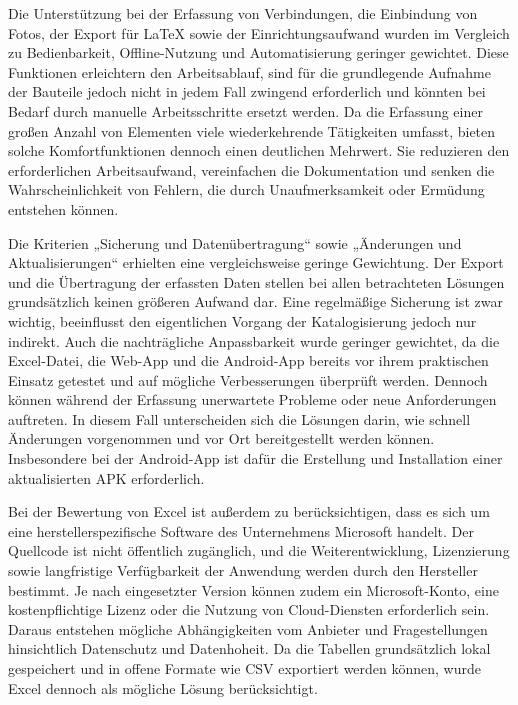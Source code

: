 Die Unterstützung bei der Erfassung von Verbindungen, die Einbindung von Fotos, der Export für \LaTeX{} sowie der Einrichtungsaufwand wurden im Vergleich zu Bedienbarkeit, Offline-Nutzung und Automatisierung geringer gewichtet.
Diese Funktionen erleichtern den Arbeitsablauf, sind für die grundlegende Aufnahme der Bauteile jedoch nicht in jedem Fall zwingend erforderlich und könnten bei Bedarf durch manuelle Arbeitsschritte ersetzt werden.
Da die Erfassung einer großen Anzahl von Elementen viele wiederkehrende Tätigkeiten umfasst, bieten solche Komfortfunktionen dennoch einen deutlichen Mehrwert.
Sie reduzieren den erforderlichen Arbeitsaufwand, vereinfachen die Dokumentation und senken die Wahrscheinlichkeit von Fehlern, die durch Unaufmerksamkeit oder Ermüdung entstehen können.

Die Kriterien „Sicherung und Datenübertragung“ sowie „Änderungen und Aktualisierungen“ erhielten eine vergleichsweise geringe Gewichtung.
Der Export und die Übertragung der erfassten Daten stellen bei allen betrachteten Lösungen grundsätzlich keinen größeren Aufwand dar.
Eine regelmäßige Sicherung ist zwar wichtig, beeinflusst den eigentlichen Vorgang der Katalogisierung jedoch nur indirekt.
Auch die nachträgliche Anpassbarkeit wurde geringer gewichtet, da die Excel-Datei, die Web-App und die Android-App bereits vor ihrem praktischen Einsatz getestet und auf mögliche Verbesserungen überprüft werden.
Dennoch können während der Erfassung unerwartete Probleme oder neue Anforderungen auftreten.
In diesem Fall unterscheiden sich die Lösungen darin, wie schnell Änderungen vorgenommen und vor Ort bereitgestellt werden können.
Insbesondere bei der Android-App ist dafür die Erstellung und Installation einer aktualisierten APK erforderlich.

Bei der Bewertung von Excel ist außerdem zu berücksichtigen, dass es sich um eine herstellerspezifische Software des Unternehmens Microsoft handelt.
Der Quellcode ist nicht öffentlich zugänglich, und die Weiterentwicklung, Lizenzierung sowie langfristige Verfügbarkeit der Anwendung werden durch den Hersteller bestimmt.
Je nach eingesetzter Version können zudem ein Microsoft-Konto, eine kostenpflichtige Lizenz oder die Nutzung von Cloud-Diensten erforderlich sein.
Daraus entstehen mögliche Abhängigkeiten vom Anbieter und Fragestellungen hinsichtlich Datenschutz und Datenhoheit.
Da die Tabellen grundsätzlich lokal gespeichert und in offene Formate wie CSV exportiert werden können, wurde Excel dennoch als mögliche Lösung berücksichtigt.

